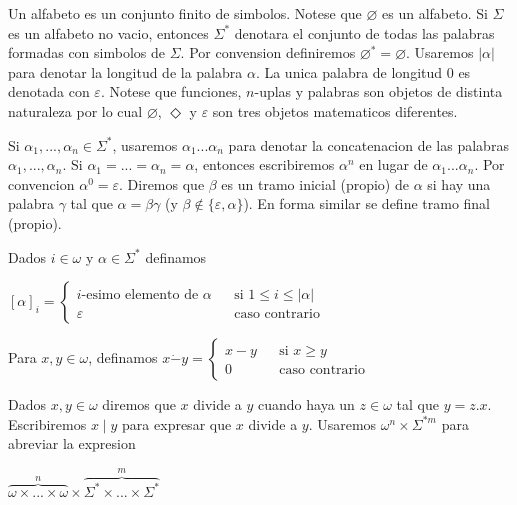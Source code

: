 Un alfabeto es un conjunto finito de simbolos. Notese que \( \varnothing \) es un alfabeto. Si \(\Sigma \) es un alfabeto no vacio, entonces \( \Sigma ^{\ast }\) denotara el conjunto de todas las palabras formadas con simbolos de \(\Sigma \). Por convension definiremos \(\varnothing ^{\ast }=\varnothing \). Usaremos \(\left\vert \alpha \right\vert \) para denotar la longitud de la palabra \(\alpha \). La unica palabra de longitud \(0\) es denotada con \(\varepsilon \). Notese que funciones, \(n\)-uplas y palabras son objetos de distinta naturaleza por lo cual \(\varnothing \), \(\Diamond \) y \( \varepsilon \) son tres objetos matematicos diferentes.

Si \(\alpha _{1},...,\alpha _{n}\in \Sigma ^{\ast }\), usaremos \(\alpha _{1}...\alpha _{n}\) para denotar la concatenacion de las palabras \( \alpha _{1},...,\alpha _{n}\). Si \(\alpha _{1}=...=\alpha _{n}=\alpha \), entonces escribiremos \(\alpha ^{n}\) en lugar de \(\alpha _{1}...\alpha _{n}\). Por convencion \(\alpha ^{0}=\varepsilon \). Diremos que \(\beta \) es un tramo inicial (propio) de \(\alpha \) si hay una palabra \(\gamma \) tal que \(\alpha =\beta \gamma \) (y \(\beta \notin \{\varepsilon ,\alpha \}\)). En forma similar se define tramo final (propio).

Dados \(i\in \omega \) y \(\alpha \in \Sigma ^{\ast }\) definamos

\(\displaystyle \left[ \alpha \right] _{i}=\left\{ \begin{array}{lll} i\text{-esimo elemento de }\alpha & & \text{si }1\leq i\leq \left\vert \alpha \right\vert \\ \varepsilon & & \text{caso contrario} \end{array} \right. \)

Para \(x,y\in \omega \), definamos
\(\displaystyle x\dot{-}y=\left\{ \begin{array}{lll} x-y & & \text{si }x\geq y \\ 0 & & \text{caso contrario} \end{array} \right. \)

Dados \(x,y\in \omega \) diremos que \(x\) divide a \(y\) cuando haya un \( z\in \omega \) tal que \(y=z.x\). Escribiremos \(x\mid y\) para expresar que \(x\) divide a \(y\).
Usaremos \(\omega ^{n}\times \Sigma ^{\ast m}\) para abreviar la expresion

\(\displaystyle \overset{n}{\overbrace{\omega \times ...\times \omega }}\times \overset{m}{ \overbrace{\Sigma ^{\ast }\times ...\times \Sigma ^{\ast }}} \)

